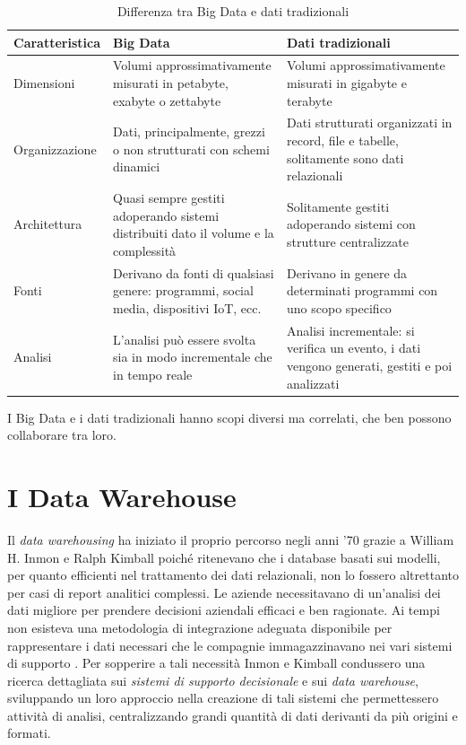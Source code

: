 \begin{longtable}{|p{4cm}|p{5cm}|p{5cm}|}
    \caption{Differenza tra Big Data e dati tradizionali} \\
    \hline
    \textbf{Caratteristica} & \textbf{Big Data} & \textbf{Dati tradizionali} \\
    \hline
    \endfirsthead 
        Dimensioni & Volumi approssimativamente misurati in petabyte, exabyte o zettabyte & Volumi approssimativamente misurati in gigabyte e terabyte\\
        \hline
        Organizzazione & Dati, principalmente, grezzi o non strutturati con schemi dinamici & Dati strutturati organizzati in record, file e tabelle, solitamente sono dati relazionali\\
        \hline
        Architettura & Quasi sempre gestiti adoperando sistemi distribuiti dato il volume e la complessità & Solitamente gestiti adoperando sistemi con strutture centralizzate\\
        \hline
        Fonti & Derivano da fonti di qualsiasi genere: programmi, social media, dispositivi IoT, ecc. & Derivano in genere da determinati programmi con uno scopo specifico\\
        \hline
        Analisi & L'analisi può essere svolta sia in modo incrementale che in tempo reale & Analisi incrementale: si verifica un evento, i dati vengono generati, gestiti e poi analizzati\\
        \hline
\end{longtable}

I Big Data e i dati tradizionali hanno scopi diversi ma correlati, che ben possono collaborare tra loro.

\section{I Data Warehouse}

Il \textit{data warehousing} ha iniziato il proprio percorso negli anni '70 grazie a William H. Inmon e Ralph Kimball poiché ritenevano che i database basati sui modelli, per quanto efficienti nel trattamento dei dati relazionali, non lo fossero altrettanto per casi di report analitici complessi. Le aziende necessitavano di un'analisi dei dati migliore per prendere decisioni aziendali efficaci e ben ragionate. Ai tempi non esisteva una metodologia di integrazione adeguata disponibile per rappresentare i dati necessari che le compagnie immagazzinavano nei vari sistemi di supporto \cite{researchgate_data_warehouse}.
Per sopperire a tali necessità Inmon e Kimball condussero una ricerca dettagliata sui \textit{sistemi di supporto decisionale} e sui \textit{data warehouse}, sviluppando un loro approccio nella creazione di tali sistemi che permettessero attività di analisi, centralizzando grandi quantità di dati derivanti da più origini e formati.

